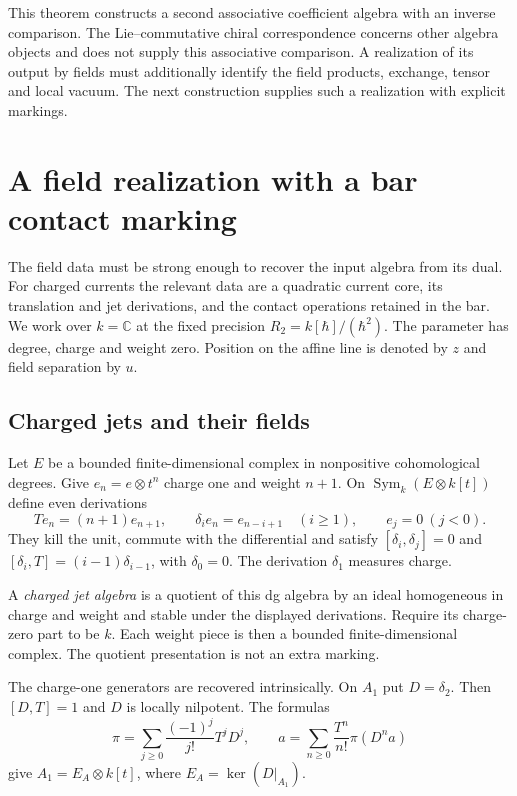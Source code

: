 This theorem constructs a second associative coefficient
algebra with an inverse comparison. The Lie--commutative
chiral correspondence concerns other algebra objects and
does not supply this associative comparison. A realization
of its output by fields must additionally identify the
field products, exchange, tensor and local vacuum. The
next construction supplies such a realization with explicit
markings.

\section{A field realization with a bar contact marking}
\label{v4-arith:md:sec:charged}

The field data must be strong enough to recover the input
algebra from its dual. For charged currents the relevant
data are a quadratic current core, its translation and
jet derivations, and the contact operations retained in
the bar. We work over $k=\mathbb C$ at the fixed precision
$R_2=k[\hbar]/(\hbar^2)$. The parameter has degree, charge
and weight zero. Position on the affine line is denoted
by $z$ and field separation by $u$.

\subsection{Charged jets and their fields}

Let $E$ be a bounded finite-dimensional complex in
nonpositive cohomological degrees. Give $e_n=e\otimes t^n$
charge one and weight $n+1$. On
$\operatorname{Sym}_k(E\otimes k[t])$ define even
derivations
\begin{equation}\label{v4-arith:md:eq:jets}
 Te_n=(n+1)e_{n+1},\qquad
 \delta_i e_n=e_{n-i+1}\quad(i\geq1),\qquad e_j=0\ (j<0).
\end{equation}
They kill the unit, commute with the differential and satisfy
$[\delta_i,\delta_j]=0$ and
$[\delta_i,T]=(i-1)\delta_{i-1}$, with $\delta_0=0$.
The derivation $\delta_1$ measures charge.

A \emph{charged jet algebra} is a quotient of this dg
algebra by an ideal homogeneous in charge and weight and
stable under the displayed derivations. Require its
charge-zero part to be $k$. Each weight piece is then
a bounded finite-dimensional complex. The quotient
presentation is not an extra marking.

The charge-one generators are recovered intrinsically.
On $A_1$ put $D=\delta_2$. Then $[D,T]=1$ and $D$ is
locally nilpotent. The formulas
\begin{equation}\label{v4-arith:md:eq:seed}
 \pi=\sum_{j\geq0}\frac{(-1)^j}{j!}T^jD^j,
 \qquad
 a=\sum_{n\geq0}\frac{T^n}{n!}\pi(D^na)
\end{equation}
give $A_1=E_A\otimes k[t]$, where $E_A=\ker(D|_{A_1})$.

